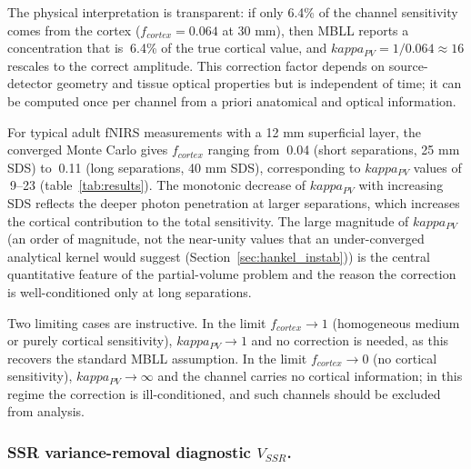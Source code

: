 \documentclass[11pt]{article}
\def\kappa{kappa}%
\def\sim{~}%
\def\mathrm#1{#1}%
\def\,{ }%
\begin{document}
The physical interpretation is transparent: if only 6.4\% of the channel sensitivity comes from the cortex ($f_{\mathrm{cortex}} = 0.064$ at 30\,mm), then MBLL reports a concentration that is $\sim$6.4\% of the true cortical value, and $\kappa_{\mathrm{PV}} = 1/0.064 \approx 16$ rescales to the correct amplitude. This correction factor depends on source-detector geometry and tissue optical properties but is independent of time; it can be computed once per channel from a priori anatomical and optical information.

For typical adult fNIRS measurements with a 12\,mm superficial layer, the converged Monte Carlo gives $f_{\mathrm{cortex}}$ ranging from $\sim$0.04 (short separations, 25\,mm SDS) to $\sim$0.11 (long separations, 40\,mm SDS), corresponding to $\kappa_{\mathrm{PV}}$ values of $\sim$9--23 (table~\ref{tab:results}). The monotonic decrease of $\kappa_{\mathrm{PV}}$ with increasing SDS reflects the deeper photon penetration at larger separations, which increases the cortical contribution to the total sensitivity. The large magnitude of $\kappa_{\mathrm{PV}}$ (an order of magnitude, not the near-unity values that an under-converged analytical kernel would suggest (Section~\ref{sec:hankel_instab})) is the central quantitative feature of the partial-volume problem and the reason the correction is well-conditioned only at long separations.

Two limiting cases are instructive. In the limit $f_{\mathrm{cortex}} \to 1$ (homogeneous medium or purely cortical sensitivity), $\kappa_{\mathrm{PV}} \to 1$ and no correction is needed, as this recovers the standard MBLL assumption. In the limit $f_{\mathrm{cortex}} \to 0$ (no cortical sensitivity), $\kappa_{\mathrm{PV}} \to \infty$ and the channel carries no cortical information; in this regime the correction is ill-conditioned, and such channels should be excluded from analysis.

\subsubsection{SSR variance-removal diagnostic \texorpdfstring{$V_{\mathrm{SSR}}$}{V\_SSR}.}
\label{sec:kappa_ssr_diag}
\end{document}
